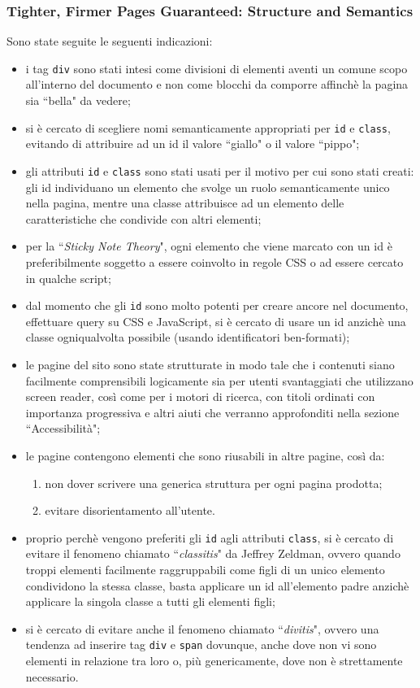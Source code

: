 \subsubsection{Tighter, Firmer Pages Guaranteed: Structure and Semantics}
Sono state seguite le seguenti indicazioni:
\begin{itemize}
\item i tag \texttt{div} sono stati intesi come divisioni di elementi aventi
un comune scopo all'interno del documento e non come blocchi da comporre
affinchè la pagina sia ``bella" da vedere;
\item si è cercato di scegliere nomi semanticamente appropriati per \texttt{id}
e \texttt{class}, evitando di attribuire ad un id il valore ``giallo" o il
valore ``pippo";
\item gli attributi \texttt{id} e \texttt{class} sono stati usati per il
motivo per cui sono stati creati: gli id individuano un elemento che svolge un
ruolo semanticamente unico nella pagina, mentre una classe attribuisce ad un
elemento delle caratteristiche che condivide con altri elementi;
\item per la ``\textit{Sticky Note Theory}", ogni elemento che viene marcato
con un id è preferibilmente soggetto a essere coinvolto in regole CSS o ad
essere cercato in qualche script;
\item dal momento che gli \texttt{id} sono molto potenti per creare ancore nel
documento, effettuare query su CSS e JavaScript, si è cercato di usare un id
anzichè una classe ogniqualvolta possibile (usando identificatori ben-formati);
\item le pagine del sito sono state strutturate in modo tale che i contenuti
siano facilmente comprensibili logicamente sia per utenti svantaggiati che
utilizzano screen reader, così come per i motori di ricerca, con titoli
ordinati con importanza progressiva e altri aiuti che verranno approfonditi
nella sezione ``Accessibilità";
\item le pagine contengono elementi che sono riusabili in altre pagine, così
da:
  \begin{enumerate}
  \item non dover scrivere una generica struttura per ogni pagina prodotta;
  \item evitare disorientamento all'utente.
  \end{enumerate}
\item proprio perchè vengono preferiti gli \texttt{id} agli attributi
\texttt{class}, si è cercato di evitare il fenomeno chiamato
``\textit{classitis}" da Jeffrey Zeldman, ovvero quando troppi elementi
facilmente raggruppabili come figli di un unico elemento condividono la stessa
classe, basta applicare un id all'elemento padre anzichè applicare la singola
classe a tutti gli elementi figli;
\item si è cercato di evitare anche il fenomeno chiamato ``\textit{divitis}",
ovvero una tendenza ad inserire tag \texttt{div} e \texttt{span} dovunque,
anche dove non vi sono elementi in relazione tra loro o, più genericamente, dove non è strettamente necessario.
\end{itemize}

